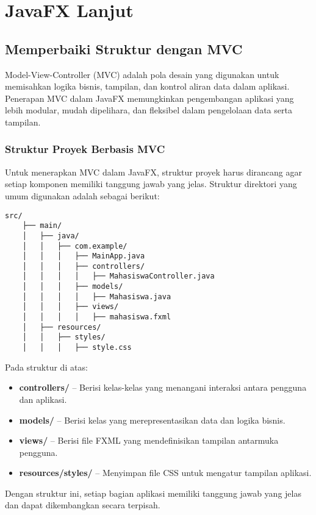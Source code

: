 \chapter{JavaFX Lanjut}

\section{Memperbaiki Struktur dengan MVC}

Model-View-Controller (MVC) adalah pola desain yang digunakan untuk memisahkan logika bisnis, tampilan, dan kontrol aliran data dalam aplikasi. Penerapan MVC dalam JavaFX memungkinkan pengembangan aplikasi yang lebih modular, mudah dipelihara, dan fleksibel dalam pengelolaan data serta tampilan.

\subsection{Struktur Proyek Berbasis MVC}

Untuk menerapkan MVC dalam JavaFX, struktur proyek harus dirancang agar setiap komponen memiliki tanggung jawab yang jelas. Struktur direktori yang umum digunakan adalah sebagai berikut:

\begin{lstlisting}[style=JavaStyle, caption=Struktur Direktori dalam JavaFX MVC]
	src/
	├── main/
	│   ├── java/
	│   │   ├── com.example/
	│   │   │   ├── MainApp.java
	│   │   │   ├── controllers/
	│   │   │   │   ├── MahasiswaController.java
	│   │   │   ├── models/
	│   │   │   │   ├── Mahasiswa.java
	│   │   │   ├── views/
	│   │   │   │   ├── mahasiswa.fxml
	│   ├── resources/
	│   │   ├── styles/
	│   │   │   ├── style.css
\end{lstlisting}

Pada struktur di atas:
\begin{itemize}
	\item \textbf{controllers/} – Berisi kelas-kelas yang menangani interaksi antara pengguna dan aplikasi.
	\item \textbf{models/} – Berisi kelas yang merepresentasikan data dan logika bisnis.
	\item \textbf{views/} – Berisi file FXML yang mendefinisikan tampilan antarmuka pengguna.
	\item \textbf{resources/styles/} – Menyimpan file CSS untuk mengatur tampilan aplikasi.
\end{itemize}

Dengan struktur ini, setiap bagian aplikasi memiliki tanggung jawab yang jelas dan dapat dikembangkan secara terpisah.


